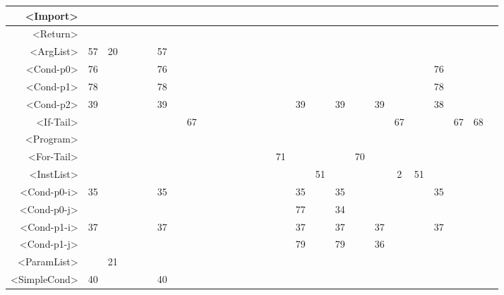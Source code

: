 \begin{tabular}{r|c@{ }c@{ }c@{ }c@{ }c@{ }c@{ }c@{ }c@{ }c@{ }c@{ }c@{ }c@{ }c@{ }c@{ }c@{ }c@{ }c@{ }c@{ }c@{ }c@{ }c@{ }c@{ }c@{ }c@{ }c@{ }c@{ }c@{ }}
<Import> &   &   &   &   &   &   &   &   &   &   &   &   &   &   &   &   &   &   &   &   &   &   &   &   &   &   &   \\\hline
<Return> &   &   &   &   &   &   &   &   &   &   &   &   &   &   &   &   &   &   &   &   &   &   &   &   &   &   &   \\\hline
<ArgList> & 57 & 20 &   &   &   & 57 &   &   &   &   &   &   &   &   &   &   &   &   &   &   &   &   &   &   &   &   &   \\\hline
<Cond-p0> & 76 &   &   &   &   & 76 &   &   &   &   &   &   &   &   &   &   &   &   &   &   &   &   &   & 76 &   &   &   \\\hline
<Cond-p1> & 78 &   &   &   &   & 78 &   &   &   &   &   &   &   &   &   &   &   &   &   &   &   &   &   & 78 &   &   &   \\\hline
<Cond-p2> & 39 &   &   &   &   & 39 &   &   &   &   &   &   &   &   &   &   & 39 &   & 39 &   & 39 &   &   & 38 &   &   &   \\\hline
<If-Tail> &   &   &   &   &   &   &   & 67 &   &   &   &   &   &   &   &   &   &   &   &   &   & 67 &   &   & 67 & 68 &   \\\hline
<Program> &   &   &   &   &   &   &   &   &   &   &   &   &   &   &   &   &   &   &   &   &   &   &   &   &   &   &   \\\hline
<For-Tail> &   &   &   &   &   &   &   &   &   &   &   &   &   &   &   & 71 &   &   &   & 70 &   &   &   &   &   &   &   \\\hline
<InstList> &   &   &   &   &   &   &   &   &   &   &   &   &   &   &   &   &   & 51 &   &   &   & 2 & 51 &   &   &   &   \\\hline
<Cond-p0-i> & 35 &   &   &   &   & 35 &   &   &   &   &   &   &   &   &   &   & 35 &   & 35 &   &   &   &   & 35 &   &   &   \\\hline
<Cond-p0-j> &   &   &   &   &   &   &   &   &   &   &   &   &   &   &   &   & 77 &   & 34 &   &   &   &   &   &   &   &   \\\hline
<Cond-p1-i> & 37 &   &   &   &   & 37 &   &   &   &   &   &   &   &   &   &   & 37 &   & 37 &   & 37 &   &   & 37 &   &   &   \\\hline
<Cond-p1-j> &   &   &   &   &   &   &   &   &   &   &   &   &   &   &   &   & 79 &   & 79 &   & 36 &   &   &   &   &   &   \\\hline
<ParamList> &   & 21 &   &   &   &   &   &   &   &   &   &   &   &   &   &   &   &   &   &   &   &   &   &   &   &   &   \\\hline
<SimpleCond> & 40 &   &   &   &   & 40 &   &   &   &   &   &   &   &   &   &   &   &   &   &   &   &   &   &   &   &   &   \\\hline

\end{tabular}
